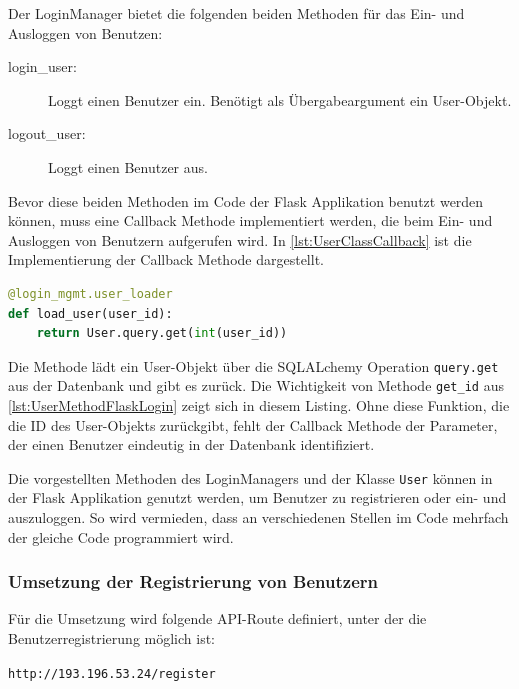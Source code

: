 \documentclass[a4paper,titlepage,halfparskip,12pt]{scrreprt}
\begin{document}
\begin{onehalfspacing}
Der LoginManager bietet die folgenden beiden Methoden für das Ein- und Ausloggen von Benutzen:

\begin{description}
\item[login\_user:] Loggt einen Benutzer ein. Benötigt als Übergabeargument ein User-Objekt.
\item[logout\_user:] Loggt einen Benutzer aus.
\end{description}

Bevor diese beiden Methoden im Code der Flask Applikation benutzt werden können, muss eine Callback Methode implementiert werden, die beim Ein- und Ausloggen von Benutzern aufgerufen wird. In \autoref{lst:UserClassCallback} ist die Implementierung der Callback Methode dargestellt.

\begin{lstlisting}[language=python, caption={Callback Methode für das Modul flask\_login}, label={lst:UserClassCallback}]
@login_mgmt.user_loader
def load_user(user_id):
    return User.query.get(int(user_id))
\end{lstlisting}

Die Methode lädt ein User-Objekt über die SQLALchemy Operation \texttt{query.get} aus der Datenbank und gibt es zurück. Die Wichtigkeit von Methode \texttt{get\_id} aus \autoref{lst:UserMethodFlaskLogin} zeigt sich in diesem Listing. Ohne diese Funktion, die die ID des User-Objekts zurückgibt, fehlt der Callback Methode der Parameter, der einen Benutzer eindeutig in der Datenbank identifiziert.\cite{flaskLogin}

Die vorgestellten Methoden des LoginManagers und der Klasse \texttt{User} können in der Flask Applikation genutzt werden, um Benutzer zu registrieren oder ein- und auszuloggen. So wird vermieden, dass an verschiedenen Stellen im Code mehrfach der gleiche Code programmiert wird.

\subsubsection*{Umsetzung der Registrierung von Benutzern}

Für die Umsetzung wird folgende \acs{API}-Route definiert, unter der die Benutzerregistrierung möglich ist:

\texttt{http://193.196.53.24/register}


\end{onehalfspacing}
\end{document}
